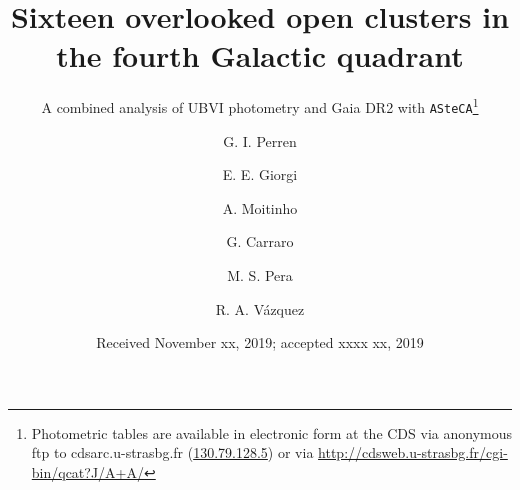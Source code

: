 \documentclass[draft]{aa}
\begin{document}
\title{Sixteen overlooked open clusters in the fourth Galactic quadrant}
\subtitle{A combined analysis of UBVI photometry and Gaia DR2 with 
\texttt{ASteCA}\thanks{
Photometric tables are available in electronic form
at the CDS via anonymous ftp to cdsarc.u-strasbg.fr (\url{130.79.128.5})
or via \url{http://cdsweb.u-strasbg.fr/cgi-bin/qcat?J/A+A/}}}

\author{G. I. Perren
      \and
      E. E. Giorgi
      \and
      A. Moitinho
      \and
      G. Carraro
      \and
      M. S. Pera
      \and
      R. A. Vázquez
}


\date{Received November xx, 2019; accepted xxxx xx, 2019}
\end{document}
